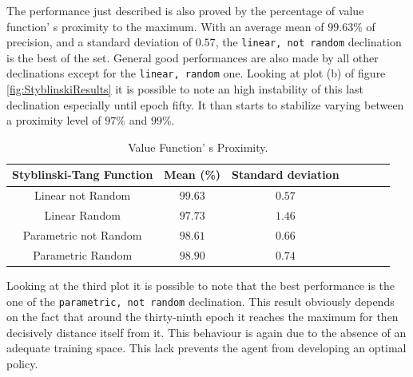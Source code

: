 The performance just described is also proved by the percentage of value function' s proximity to the maximum. With an average mean of $99.63\%$ of precision, and a standard deviation of $0.57$, the {\tt linear, not random} declination is the best of the set. General good performances are also made by all other declinations except for the {\tt linear, random} one. Looking at plot (b) of figure \ref{fig:StyblinskiResults} it is possible to note an high instability of this last declination especially until epoch fifty. It than starts to stabilize varying between a proximity level of $97\%$ and $99\%$.

\begin{table}[h!]
	\centering
	\resizebox{\linewidth}{!} {
		\begin{tabular}{c| cccccc} 
			\hline \textbf{Styblinski-Tang Function}
			& \textbf{Mean (\%)} & \textbf{Standard deviation}\\ 
			\hline Linear not Random
			& \cellcolor{green!25}$99.63$ & \cellcolor{green!25}$0.57$ \\ 
			\hline Linear Random
			& $97.73$ & $1.46$ \\ 
			\hline Parametric not Random
			& $98.61$ & $0.66$\\ 
			\hline Parametric Random
			& $98.90$ & $0.74$\\ 
			\hline 
		\end{tabular} 
	}
	\label{StyblinskiTabProximity}
	\caption{Value Function' s Proximity.} 
\end{table}

Looking at the third plot it is possible to note that the best performance is the one of the {\tt parametric, not random} declination. This result obviously depends on the fact that around the thirty-ninth epoch it reaches the maximum for then decisively distance itself from it. This behaviour is again due to the absence of an adequate training space. This lack prevents the agent from developing an optimal policy.

